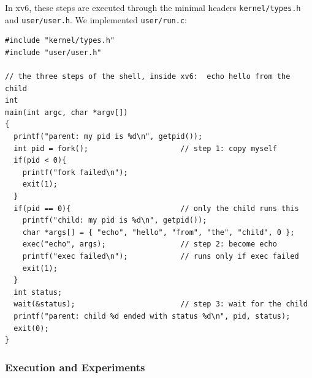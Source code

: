 \documentclass{labreport}
\begin{document}
In xv6, these steps are executed through the minimal headers \texttt{kernel/types.h} and \texttt{user/user.h}. We implemented \texttt{user/run.c}:

\begin{lstlisting}[style=c]
#include "kernel/types.h"
#include "user/user.h"

// the three steps of the shell, inside xv6:  echo hello from the child
int
main(int argc, char *argv[])
{
  printf("parent: my pid is %d\n", getpid());
  int pid = fork();                     // step 1: copy myself
  if(pid < 0){
    printf("fork failed\n");
    exit(1);
  }
  if(pid == 0){                         // only the child runs this
    printf("child: my pid is %d\n", getpid());
    char *args[] = { "echo", "hello", "from", "the", "child", 0 };
    exec("echo", args);                 // step 2: become echo
    printf("exec failed\n");            // runs only if exec failed
    exit(1);
  }
  int status;
  wait(&status);                        // step 3: wait for the child
  printf("parent: child %d ended with status %d\n", pid, status);
  exit(0);
}
\end{lstlisting}

\subsubsection{Execution and Experiments}
\end{document}
